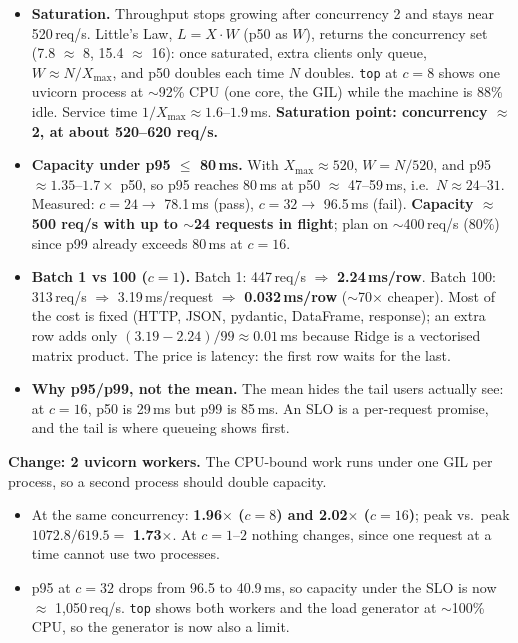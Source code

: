\documentclass[10pt]{article}
\newcommand{\code}[1]{\texttt{#1}}
\begin{document}
\begin{itemize}
  \item \textbf{Saturation.} Throughput stops growing after concurrency 2 and stays near 520\,req/s. Little's Law,
  $L = X\cdot W$ (p50 as $W$), returns the concurrency set (7.8 $\approx$ 8, 15.4 $\approx$ 16): once saturated, extra clients only queue,
  $W \approx N/X_{\max}$, and p50 doubles each time $N$ doubles. \code{top} at $c=8$ shows one uvicorn process at $\sim$92\% CPU
  (one core, the GIL) while the machine is 88\% idle. Service time $1/X_{\max} \approx 1.6$--$1.9$\,ms.
  \textbf{Saturation point: concurrency $\approx$ 2, at about 520--620 req/s.}
  \item \textbf{Capacity under p95 $\le$ 80\,ms.} With $X_{\max}\approx 520$, $W=N/520$, and p95 $\approx 1.35$--$1.7\times$ p50,
  so p95 reaches 80\,ms at p50 $\approx$ 47--59\,ms, i.e.\ $N \approx 24$--$31$. Measured: $c=24 \to$ 78.1\,ms (pass), $c=32 \to$ 96.5\,ms (fail).
  \textbf{Capacity $\approx$ 500 req/s with up to $\sim$24 requests in flight}; plan on $\sim$400\,req/s (80\%) since p99 already exceeds 80\,ms at $c=16$.
  \item \textbf{Batch 1 vs 100 ($c=1$).} Batch 1: 447\,req/s $\Rightarrow$ \textbf{2.24\,ms/row}. Batch 100: 313\,req/s $\Rightarrow$ 3.19\,ms/request
  $\Rightarrow$ \textbf{0.032\,ms/row} ($\sim$70$\times$ cheaper). Most of the cost is fixed (HTTP, JSON, pydantic, DataFrame, response); an extra row
  adds only $(3.19-2.24)/99 \approx 0.01$\,ms because Ridge is a vectorised matrix product. The price is latency: the first row waits for the last.
  \item \textbf{Why p95/p99, not the mean.} The mean hides the tail users actually see: at $c=16$, p50 is 29\,ms but p99 is 85\,ms.
  An SLO is a per-request promise, and the tail is where queueing shows first.
\end{itemize}

\textbf{Change: 2 uvicorn workers.} The CPU-bound work runs under one GIL per process, so a second process should double capacity.

\begin{itemize}
  \item At the same concurrency: \textbf{1.96$\times$ ($c=8$) and 2.02$\times$ ($c=16$)}; peak vs.\ peak $1072.8/619.5 =$ \textbf{1.73$\times$}.
  At $c=1$--$2$ nothing changes, since one request at a time cannot use two processes.
  \item p95 at $c=32$ drops from 96.5 to 40.9\,ms, so capacity under the SLO is now $\approx$ 1{,}050\,req/s. \code{top} shows both workers
  and the load generator at $\sim$100\% CPU, so the generator is now also a limit.
\end{itemize}
\end{document}
